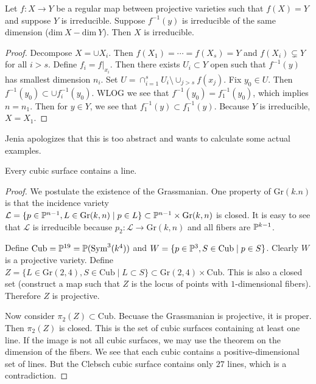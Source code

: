 \documentclass[twoside, 10pt]{article}
\begin{document}
    \begin{thm} Let $f:X \to Y$ be a regular map between projective varieties
        such that $f(X) = Y$ and suppose $Y$ is irreducible. Suppose
        $f^{-1}(y)$ is irreducible of the same dimension ($\mathrm{dim}\ X -
        \mathrm{dim}\ Y$). Then $X$ is irreducible.  \begin{proof} Decompose $X
            = \cup X_i$. Then $f(X_1) = \cdots = f(X_s) = Y$ and $f(X_i)
            \subsetneq Y$ for all $i > s$. Define $f_i = f \vert_{x_i}$. Then
            there exists $U_i \subset Y$ open such that $f^{-1}(y)$ has
            smallest dimension $n_i$. Set $U = \cap_{i=1}^s U_i \setminus
            \cup_{j > s} f(x_j)$. Fix $y_0 \in U$. Then $f^{-1}(y_0) \subset
            \cup f_i^{-1}(y_0)$. WLOG we see that $f^{-1}(y_0) =
        f_1^{-1}(y_0)$, which implies $n = n_1$. Then for $y \in Y$, we see
    that $f_1^{-1}(y) \subset f_1^{-1}(y)$. Because $Y$ is irreducible, $X =
X_1$.  \end{proof} \end{thm}

    Jenia apologizes that this is too abstract and wants to calculate some
    actual examples.

    \begin{thm} Every cubic surface contains a line.  \begin{proof} We
        postulate the existence of the Grassmanian. One property of
        $\mathrm{Gr}(k.n)$ is that the incidence variety $\mathcal{L} = \{p \in
        \P^{n-1}, L \in \mathrm{Gr}(k,n) \mid p \in L\} \subset \P^{n-1} \times
        \mathrm{Gr}(k,n)$ is closed. It is easy to see that $\mathcal{L}$ is
        irreducible because $p_2: \mathcal{L} \to \mathrm{Gr}(k,n)$ and all
        fibers are $\P^{k-1}$.

            Define $\mathrm{Cub} = \P^{19} = \P(\mathrm{Sym}^3(k^4))$ and $W =
            \{p \in \P^3, S \in \mathrm{Cub} \mid p \in S\}$. Clearly $W$ is a
            projective variety. Define $Z = \{L \in \mathrm{Gr}(2,4), S \in
            \mathrm{Cub} \mid L \subset S\} \subset \mathrm{Gr}(2,4) \times
            \mathrm{Cub}$. This is also a closed set (construct a map such that
            $Z$ is the locus of points with $1$-dimensional fibers). Therefore
            $Z$ is projective.

            Now consider $\pi_2(Z) \subset \mathrm{Cub}$. Becuase the
            Grassmanian is projective, it is proper. Then $\pi_2(Z)$ is closed.
            This is the set of cubic surfaces containing at least one line. If
            the image is not all cubic surfaces, we may use the theorem on the
            dimension of the fibers. We see that each cubic contains a
            positive-dimensional set of lines. But the Clebsch cubic surface
            contains only $27$ lines, which is a contradiction.  \end{proof}
        \end{thm}
\end{document}
